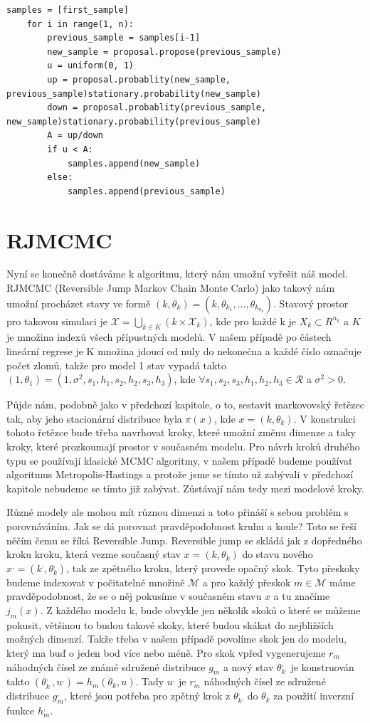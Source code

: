 \documentclass[czech,master,public,dept470,male,cpdeclaration,oneside, python]{diploma}
\begin{document}
\begin{lstlisting}[label=src:mj,caption=Metropoli-Hastings]
	samples = [first_sample]
	for i in range(1, n):
		previous_sample = samples[i-1]
		new_sample = proposal.propose(previous_sample)
		u = uniform(0, 1)
		up = proposal.probablity(new_sample, previous_sample)stationary.probability(new_sample)
		down = proposal.probablity(previous_sample, new_sample)stationary.probability(previous_sample)
		A = up/down
	    if u < A:
	    	samples.append(new_sample)
   		else:
   			samples.append(previous_sample)
\end{lstlisting}
\section{RJMCMC}
Nyní se konečně dostáváme k algoritmu, který nám umožní vyřešit náš model.
RJMCMC (Reversible Jump Markov Chain Monte Carlo)\cite{green2009reversible} jako takový nám umožní procházet stavy ve formě $(k, \theta_k) = (k, \theta_{k_1}, ..., \theta_{k_{n_k}})$. Stavový prostor pro takovou simulaci je $\mathcal{X} = \bigcup_{k \in K} ({k} \times \mathcal{X}_k)$, kde pro každé k je $X_k \subset R^{n_k}$ a $K$ je množina indexů všech přípustných modelů. V našem případě po částech lineární regrese je K množina jdoucí od nuly do nekonečna a každé číslo označuje počet zlomů, takže pro model 1 stav vypadá takto $(1, \theta_1) = (1, \sigma^2, s_1, h_1, s_2, h_2, s_3, h_3)$, kde $ \forall s_1, s_2, s_3, h_1, h_2, h_3 \in \mathcal{R}$ a $\sigma^2 > 0$. \par
Půjde nám, podobně jako v předchozí kapitole, o to, sestavit markovovský řetězec tak, aby jeho stacionární distribuce byla $\pi(x)$, kde $x = (k, \theta_k)$. V konstrukci tohoto řetězce bude třeba navrhovat kroky, které umožní změnu dimenze a taky kroky, které prozkoumají prostor v současném modelu. Pro návrh kroků druhého typu se používají klasické MCMC algoritmy, v našem případě budeme používat algoritmus Metropolis-Hastings a protože jsme se tímto už zabývali v předchozí kapitole nebudeme se tímto již zabývat. Zůstávají nám tedy mezi modelové kroky. \par
Různé modely ale mohou mít různou dimenzi a toto přináší s sebou problém s porovnáváním. Jak se dá porovnat pravděpodobnost kruhu a koule? Toto se řeší něčím čemu se říká Reversible Jump. Reversible jump se skládá jak z dopředného kroku kroku, která vezme současný stav $x = (k, \theta_k)$ do stavu nového $x^{,} = (k^{,}, \theta_k^{,})$, tak ze zpětného kroku, který provede opačný skok. Tyto přeskoky budeme indexovat v počitatelné množině $\mathcal{M}$ a pro každý přeskok $m \in \mathcal{M}$ máme pravděpodobnost, že se o něj pokusíme v současném stavu $x$ a tu značíme $j_m(x)$. Z každého modelu k, bude obvykle jen několik skoků o které se můžeme pokusit, většinou to budou takové skoky, které budou skákat do nejbližších možných dimenzí. Takže třeba v našem případě povolíme skok jen do modelu, který ma buď o jeden bod více nebo méně. Pro skok vpřed vygenerujeme $r_m$ náhodných čísel ze známé sdružené distribuce $g_m$ a nový stav $\theta^{,}_{k^{,}}$ je konstruován takto $(\theta^{,}_{k^{,}}, u^{,}) = h_m(\theta_k, u)$. Tady $u^{,}$ je $r^{,}_m$ náhodných čísel ze sdružené distribuce $g^{,}_m$, které jsou potřeba pro zpětný krok z $\theta^{,}_{k^{,}}$ do $\theta_k$ za použití inverzní funkce $h^,_m$.
\end{document}
